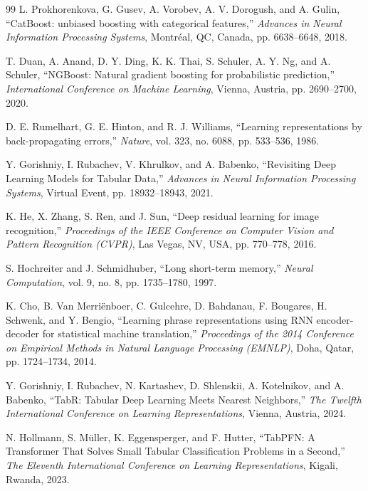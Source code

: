 \documentclass[journal]{IEEEtran}
\begin{document}
\begin{thebibliography}{99}
L. Prokhorenkova, G. Gusev, A. Vorobev, A. V. Dorogush, and A. Gulin, ``CatBoost: unbiased boosting with categorical features,'' \emph{Advances in Neural Information Processing Systems}, Montr\'eal, QC, Canada, pp. 6638--6648, 2018.%

T. Duan, A. Anand, D. Y. Ding, K. K. Thai, S. Schuler, A. Y. Ng, and A. Schuler, ``NGBoost: Natural gradient boosting for probabilistic prediction,'' \emph{International Conference on Machine Learning}, Vienna, Austria, pp. 2690--2700, 2020.%

D. E. Rumelhart, G. E. Hinton, and R. J. Williams, ``Learning representations by back-propagating errors,'' \emph{Nature}, vol. 323, no. 6088, pp. 533--536, 1986.%

Y. Gorishniy, I. Rubachev, V. Khrulkov, and A. Babenko, ``Revisiting Deep Learning Models for Tabular Data,'' \emph{Advances in Neural Information Processing Systems}, Virtual Event, pp. 18932--18943, 2021.%

K. He, X. Zhang, S. Ren, and J. Sun, ``Deep residual learning for image recognition,'' \emph{Proceedings of the IEEE Conference on Computer Vision and Pattern Recognition (CVPR)}, Las Vegas, NV, USA, pp. 770--778, 2016.%

S. Hochreiter and J. Schmidhuber, ``Long short-term memory,'' \emph{Neural Computation}, vol. 9, no. 8, pp. 1735--1780, 1997.%

K. Cho, B. Van Merri\"enboer, C. Gulcehre, D. Bahdanau, F. Bougares, H. Schwenk, and Y. Bengio, ``Learning phrase representations using RNN encoder-decoder for statistical machine translation,'' \emph{Proceedings of the 2014 Conference on Empirical Methods in Natural Language Processing (EMNLP)}, Doha, Qatar, pp. 1724--1734, 2014.%

Y. Gorishniy, I. Rubachev, N. Kartashev, D. Shlenskii, A. Kotelnikov, and A. Babenko, ``TabR: Tabular Deep Learning Meets Nearest Neighbors,'' \emph{The Twelfth International Conference on Learning Representations}, Vienna, Austria, 2024.%

N. Hollmann, S. M\"uller, K. Eggensperger, and F. Hutter, ``TabPFN: A Transformer That Solves Small Tabular Classification Problems in a Second,'' \emph{The Eleventh International Conference on Learning Representations}, Kigali, Rwanda, 2023.%


\end{thebibliography}
\end{document}

